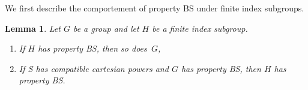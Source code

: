 \documentclass[a4paper]{article}
\newtheorem{lem}{Lemma}[section]
\theoremstyle{definition}
\DeclareMathOperator\Hom{Hom}
\begin{document}
%
%
We first describe the comportement of property BS under finite index subgroups.
%
%
\begin{lem}\label{Lemma:Subgroup}
Let $G$ be a group and let $H$ be a finite index subgroup.
\begin{enumerate}
\item
If $H$ has property BS, then so does~$G$,
\item
If S has compatible cartesian powers and $G$ has property BS, then $H$ has property BS.
\end{enumerate}
\end{lem}
\end{document}
